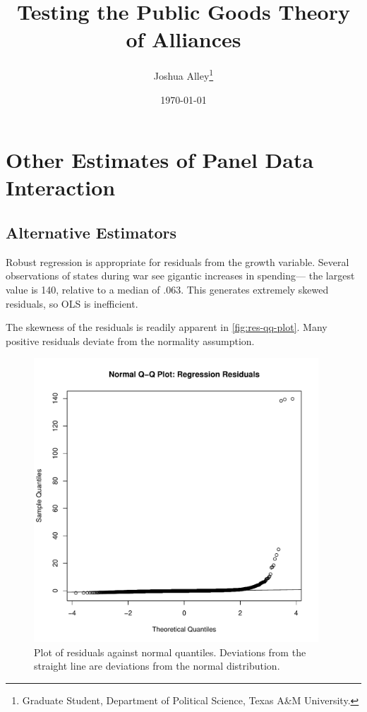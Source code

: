 \documentclass[12pt]{article}
\title{
\textbf{Testing the Public Goods Theory of Alliances}
	}
\author{Joshua Alley\footnote{Graduate Student,
Department of Political Science, Texas A\&M University.}}
\date{{\normalsize \today}}
\begin{document}
\maketitle 

\doublespace



\section{Other Estimates of Panel Data Interaction}


\subsection{Alternative Estimators}

Robust regression is appropriate for residuals from the growth variable. 
Several observations of states during war see gigantic increases in spending--- the largest value is 140, relative to a median of .063. 
This generates extremely skewed residuals, so OLS is inefficient. 


The skewness of the residuals is readily apparent in \autoref{fig:res-qq-plot}. 
Many positive residuals deviate from the normality assumption. 


\begin{figure}[htbp]
	\centering
		\includegraphics[width=0.95\textwidth]{res-qq-plot.pdf}
	\caption{Plot of residuals against normal quantiles. Deviations from the straight line are deviations from the normal distribution.}
	\label{fig:res-qq-plot}
\end{figure}
\end{document}
